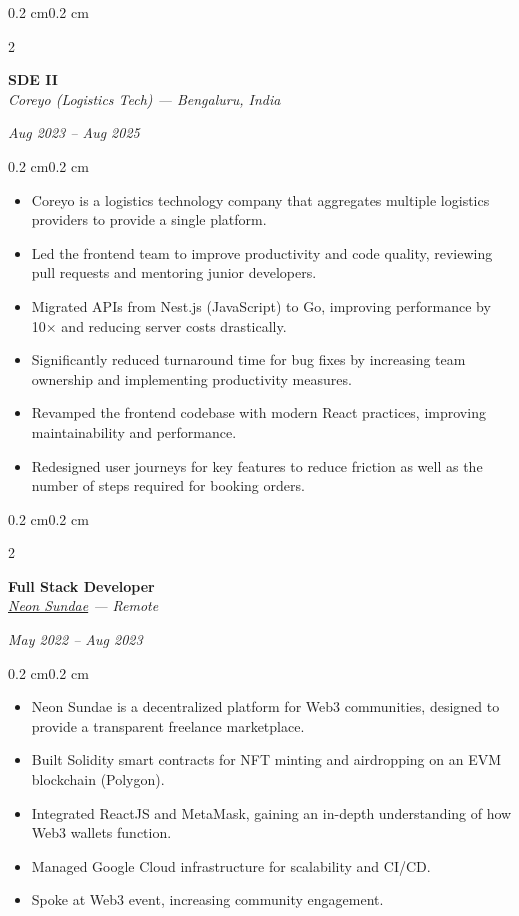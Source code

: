 \documentclass[10pt, letterpaper]{article}
\newenvironment{highlights}{
    \begin{itemize}[
        topsep=0.10 cm,
        parsep=0.10 cm,
        partopsep=0pt,
        itemsep=0pt,
        leftmargin=0.5 cm
    ]
}{
    \end{itemize}
}
\newenvironment{onecolentry}{
    \begin{adjustwidth}{0.2 cm}{0.2 cm}
}{
    \end{adjustwidth}
}
\newenvironment{twocolentry}[2][]{
    \onecolentry
    \def\secondColumn{#2}
    \setcolumnwidth{\fill, 4.5 cm}
    \begin{paracol}{2}
}{
    \switchcolumn \raggedleft \secondColumn
    \end{paracol}
    \endonecolentry
}
\begin{document}
\begin{twocolentry}{\textit{Aug 2023 -- Aug 2025}}
    \textbf{SDE II} \\
    \textit{Coreyo (Logistics Tech) — Bengaluru, India}
\end{twocolentry}
\begin{onecolentry}
\begin{highlights}
    \item Coreyo is a logistics technology company that aggregates multiple logistics providers to provide a single platform.
    \item Led the frontend team to improve productivity and code quality, reviewing pull requests and mentoring junior developers.
    \item Migrated APIs from Nest.js (JavaScript) to Go, improving performance by 10× and reducing server costs drastically.
    \item Significantly reduced turnaround time for bug fixes by increasing team ownership and implementing productivity measures.
    \item Revamped the frontend codebase with modern React practices, improving maintainability and performance.
    \item Redesigned user journeys for key features to reduce friction as well as the number of steps required for booking orders.
\end{highlights}
\end{onecolentry}

\vspace{0.2cm}

\begin{twocolentry}{\textit{May 2022 -- Aug 2023}}
    \textbf{Full Stack Developer} \\
    \textit{\href{https://app.neonsundae.xyz}{Neon Sundae} — Remote}
\end{twocolentry}
\begin{onecolentry}
\begin{highlights}
    \item Neon Sundae is a decentralized platform for Web3 communities, designed to provide a transparent freelance marketplace.
    \item Built Solidity smart contracts for NFT minting and airdropping on an EVM blockchain (Polygon).
    \item Integrated ReactJS and MetaMask, gaining an in-depth understanding of how Web3 wallets function.
    \item Managed Google Cloud infrastructure for scalability and CI/CD.
    \item Spoke at Web3 event, increasing community engagement.
\end{highlights}
\end{onecolentry}
\end{document}
